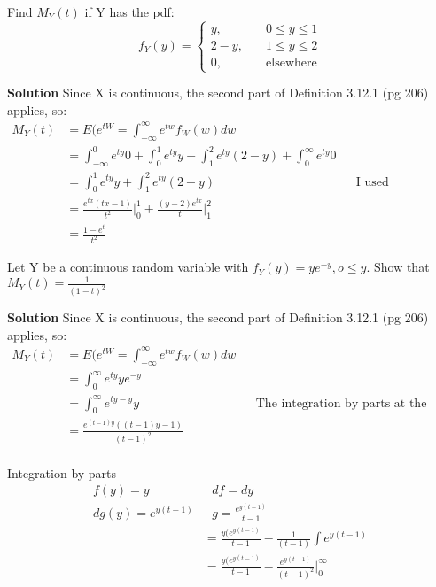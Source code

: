 \documentclass[12pt]{article}
\newenvironment{problem}[2][Problem]{\begin{trivlist}
\item[\hskip \labelsep {\bfseries #1}\hskip \labelsep {\bfseries #2.}]}{\end{trivlist}}
\begin{document}
\begin{problem}{3.12.6} Find $M_Y(t)$ if Y has the pdf: 
$$
f_Y(y) = \left\{
        \begin{array}{ll}
            y, & \quad 0 \leq y \leq 1 \\
            2-y, & \quad 1 \leq y \leq 2 \\
		0,  & \quad \text{elsewhere}
        \end{array}
    \right.
$$

\textbf{Solution} Since X is continuous, the second part of Definition 3.12.1 (pg 206) applies, so: 
\begin{align*}
M_Y(t) &= E(e^{tW}= \int_{-\infty}^{\infty} e^{tw}f_W(w)dw  \\
&= \int_{-\infty}^{0} e^{ty}0 + \int_{0}^{1} e^{ty}y + \int_{1}^{2} e^{ty}(2-y) + \int_{0}^{\infty} e^{ty}0 \\
&= \int_{0}^{1} e^{ty}y + \int_{1}^{2} e^{ty}(2-y)  && \text{I used WolframAlpha here.} \\
&=\frac{e^{tx}(tx-1)}{t^2} \Big|_0^1 + \frac{(y-2)e^{tx}}{t}\Big|_1^2  \\
&= \frac{1-e^t}{t^2}
\end{align*}
\end{problem}


\begin{problem}{3.12.8} Let Y be a continuous random variable with $f_Y(y) = ye^{-y}, o \leq y$. Show that $M_Y(t) = \frac{1}{(1-t)^2}$ 

\textbf{Solution} Since X is continuous, the second part of Definition 3.12.1 (pg 206) applies, so: 
\begin{align*}
M_Y(t) &= E(e^{tW}= \int_{-\infty}^{\infty} e^{tw}f_W(w)dw  \\
&= \int_{0}^{\infty} e^{ty}ye^{-y}  \\
&= \int_{0}^{\infty} e^{ty-y}y  && \text{The integration by parts at the end if you want to see it.}\\
&= \frac{e^{(t-1)y}((t-1)y-1)}{(t-1)^2} \\
\end{align*}

Integration by parts
\begin{align*}
f(y) = y & \ \ \ df = dy  \\
dg(y) = e^{y(t-1)} & \ \ \ g = \frac{e^{y(t-1)}}{t-1} \\
&= \frac{y(e^{y(t-1)}}{t-1} - \frac{1}{(t-1)}\int e^{y(t-1)} \\
&= \frac{y(e^{y(t-1)}}{t-1} - \frac{e^{y(t-1)}}{(t-1)^2} \Big|_0^{\infty} \\
 \end{align*}
\end{problem}
\end{document}
